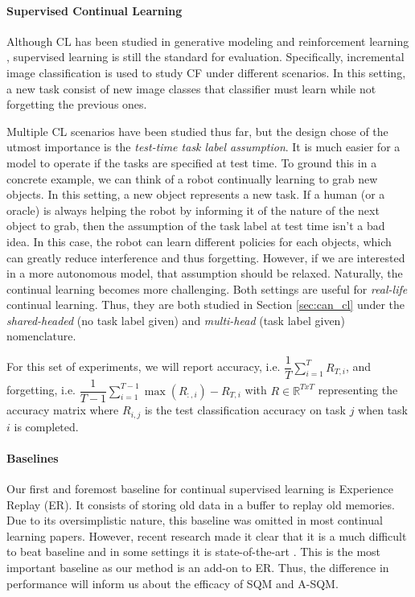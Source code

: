 \documentclass[colorinlistoftodos]{article} %
\begin{document}
\paragraph{Supervised Continual Learning} Although CL has been studied in generative modeling \citep{lesort2018generative,ramapuram2017lifelong,Zhai2019LifelongGC} and reinforcement learning \citep{kirkpatrick2017overcoming,fernando2017pathnet,riemer2018learning}, supervised learning is still the standard for evaluation. Specifically, incremental image classification is used to study CF under different scenarios. In this setting, a new task consist of new image classes that classifier must learn while not forgetting the previous ones. 

Multiple CL scenarios have been studied thus far, but the design chose of the utmost importance is the \textit{test-time task label assumption}. It is much easier for a model to operate if the tasks are specified at test time. To ground this in a concrete example, we can think of a robot continually learning to grab new objects. In this setting, a new object represents a new task. If a human (or a oracle) is always helping the robot by informing it of the nature of the next object to grab, then the assumption of the task label at test time isn't a bad idea. In this case, the robot can learn different policies for each objects, which can greatly reduce interference and thus forgetting. However, if we are interested in a more autonomous model, that assumption should be relaxed. Naturally, the continual learning becomes more challenging. Both settings are useful for \textit{real-life} continual learning. Thus, they are both studied in Section \ref{sec:can_cl} under the \textit{shared-headed} (no task label given) and \textit{multi-head} (task label given) nomenclature.

For this set of experiments, we will report accuracy, i.e. $\dfrac{1}{T} \sum_{i=1}^T R_{T,i}$, and forgetting, i.e. $\dfrac{1}{T-1} \sum_{i=1}^{T-1} \max(R_{:,i}) - R_{T,i}$
with $R \in \mathbb{R}^{TxT}$ representing the accuracy matrix where $R_{i,j}$ is the test classification accuracy on task $j$ when task $i$ is completed.


\paragraph{Baselines}
Our first and foremost baseline for continual supervised learning is Experience Replay (ER). It consists of storing old data in a buffer to replay old memories. Due to its oversimplistic nature, this baseline was omitted in most continual learning papers. However, recent research made it clear that it is a much difficult to beat baseline and in some settings it is state-of-the-art \citep{chaudhry2019continual,aljundi2019online,aljundi2018Online} . This is the most important baseline as our method is an add-on to ER. Thus, the difference in performance will inform us about the efficacy of SQM and A-SQM. 
\end{document}
